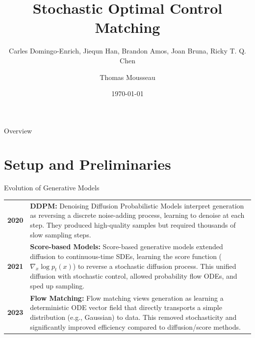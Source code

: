 \documentclass[aspectratio=169,xcolor=dvipsnames]{beamer}
\title{Stochastic Optimal Control Matching}
\subtitle{Carles Domingo-Enrich, Jiequn Han, Brandon Amos, Joan Bruna, Ricky T. Q. Chen}
\author{Thomas Mousseau}
\date{\today} %
\begin{document}
\begin{frame}
    \titlepage
\end{frame}

\begin{frame}{Overview}
    \tableofcontents
\end{frame}

\section{Setup and Preliminaries}

\begin{frame}{Evolution of Generative Models}
    \begin{center}
        \begin{minipage}{0.9\textwidth}
            \vspace{0.3cm}
            
            \small
            \begin{tabular}{@{}l@{\hspace{0.8cm}}p{}@{}}
                \textbf{2020} & \textbf{DDPM:} Denoising Diffusion Probabilistic Models interpret generation as reversing a discrete noise-adding process, learning to denoise at each step. They produced high-quality samples but required thousands of slow sampling steps. \\[0.4cm]
                
                \textbf{2021} & \textbf{Score-based Models:} Score-based generative models extended diffusion to continuous-time SDEs, learning the score function ($\nabla_x \log p_t(x)$) to reverse a stochastic diffusion process. This unified diffusion with stochastic control, allowed probability flow ODEs, and sped up sampling. \\[0.4cm]
                
                \textbf{2023} & \textbf{Flow Matching:} Flow matching views generation as learning a deterministic ODE vector field that directly transports a simple distribution (e.g., Gaussian) to data. This removed stochasticity and significantly improved efficiency compared to diffusion/score methods. \\[0.4cm]
            \end{tabular}
            
            \vspace{0.3cm}
        \end{minipage}
    \end{center}
\end{frame}
\end{document}
